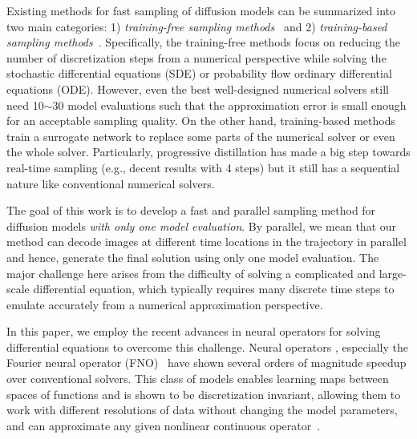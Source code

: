 Existing methods for fast sampling of diffusion models can be summarized into two main categories: 1) \emph{training-free sampling methods}~\citep{song2020denoising,lu2022dpm} and 2) \emph{training-based sampling methods}~\citep{luhman2021knowledge,salimans2021progressive,xiao2021tackling}. Specifically, the training-free methods focus on reducing the number of discretization steps from a numerical perspective while solving the stochastic differential equations (SDE) or probability flow ordinary differential equations (ODE). However, even the best well-designed numerical solvers \cite{lu2022dpm, karras2022elucidating} still need 10$\sim$30 model evaluations such that the approximation error is small enough for an acceptable sampling quality.
On the other hand, training-based methods train a  surrogate network to replace some parts of the numerical solver or even the whole solver. Particularly, progressive distillation \cite{salimans2021progressive} has made a big step towards real-time sampling (e.g., decent results with 4 steps) but it still has a sequential nature like conventional numerical solvers. %

The goal of this work is to develop a fast and parallel sampling method for diffusion models \emph{with only one model evaluation}. By parallel, we mean that our method can decode images at different time locations in the trajectory in parallel and hence, generate the final solution using only one model evaluation. The major challenge here arises from the difficulty of solving a complicated and large-scale differential equation, which typically requires many discrete time steps to emulate accurately from a numerical approximation perspective. 

In this paper, we employ the recent advances in neural operators for solving differential equations to overcome this challenge. 
Neural operators \citep{li2020neural,kovachki2021neural}, especially the Fourier neural operator (FNO)~\cite{li2020fourier} have shown several orders of magnitude speedup over conventional solvers. This class of models enables learning maps between spaces of functions and is shown to be discretization invariant, allowing them to work with different resolutions of data without changing the model parameters, and can approximate any given nonlinear continuous operator~\cite{kovachki2021universal}. 

